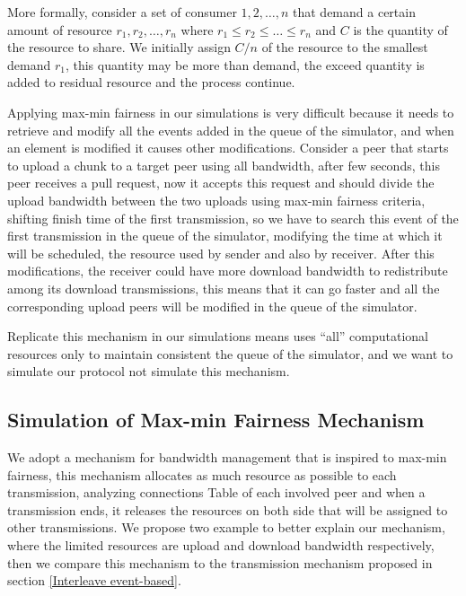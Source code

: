 More formally, consider a set of consumer $1, 2, \ldots, n$ that demand a certain amount of resource $r_{1},r_{2},\ldots,r_{n}$ where  
$r_{1} \leq r_{2} \leq\ldots\leq r_{n}$ and $C$ is the quantity of the resource to share. We initially assign $C/n$ of the resource to the smallest demand $r_{1}$, this quantity may be more than demand, the exceed quantity is added to residual resource and the process continue.

Applying max-min fairness in our simulations is very difficult because it needs to retrieve and modify all the events added in the queue of the simulator, and when an element is modified it causes other modifications. Consider a peer that starts to upload a chunk to a target peer using all bandwidth, after few seconds, this peer receives a pull request, now it accepts this request and should divide the upload bandwidth between the two uploads using max-min fairness criteria, shifting finish time of the first transmission, so we have to search this event of the first transmission in the queue of the simulator, modifying the time at which it will be scheduled, the resource used by sender and also by receiver. After this modifications, the receiver could have more download bandwidth to redistribute among its download transmissions, this means that it can go faster and all the corresponding upload peers will be modified in the queue of the simulator.

Replicate this mechanism in our simulations means uses ``all'' computational resources only to maintain consistent the queue of the simulator, and we want to simulate our protocol not simulate this mechanism.

\subsection{Simulation of Max-min Fairness Mechanism}
We adopt a mechanism for bandwidth management that is inspired to max-min fairness, this mechanism allocates as much resource as possible to each transmission, analyzing connections Table of each involved peer and when a transmission ends, it releases the resources on both side that will be assigned to other transmissions. We propose two example to better explain our mechanism, where the limited resources are upload and download bandwidth respectively, then we compare this mechanism to the transmission mechanism proposed in section \ref{Interleave event-based}.

